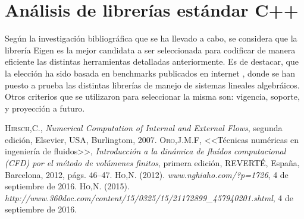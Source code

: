 \section{Análisis de librerías estándar C++}

	Según la investigación bibliográfica que se ha llevado a cabo, se considera que la librería Eigen es la mejor candidata a ser seleccionada para codificar de manera eficiente las distintas herramientas detalladas anteriormente. Es de destacar, que la elección ha sido basada en benchmarks publicados en internet \cite{chino}\cite{chino2}, donde se han puesto a prueba las distintas librerías de manejo de sistemas lineales algebráicos. Otros criterios que se utilizaron para seleccionar la misma son: vigencia, soporte, y proyección a futuro. 


\begin{thebibliography}{X}
 \textsc{Hirsch,C.},
\textit{Numerical Computation of Internal and External Flows}, segunda edición,
Elsevier, USA, Burlingtom, 2007.
 \textsc{Oro,J.M.F},
<<Técnicas numéricas en ingeniería de fluidos>>,
\textit{Introducción a la dinámica de fluídos computacional (CFD) por el método de volúmenes finitos}, primera edición, REVERTÉ, España, Barcelona, 2012, págs. 46--47.
 \textsc{Ho,N.} (2012).
\textit{www.nghiaho.com/?p=1726}, 4 de septiembre de 2016.
 \textsc{Ho,N.} (2015).
\textit{http://www.360doc.com/content/15/0325/15/21172899\_457940201.shtml}, 4 de septiembre de 2016.

\end{thebibliography}





 


